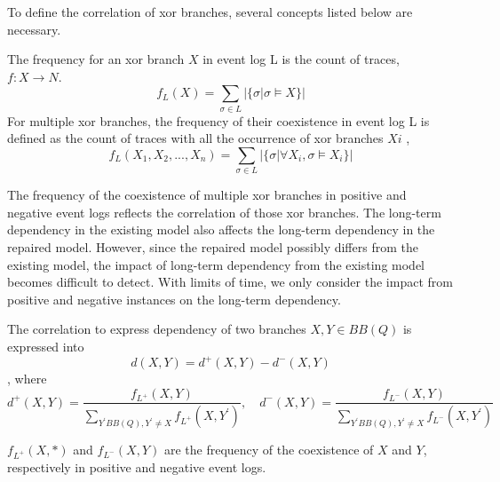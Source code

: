 To define the correlation of xor branches, several concepts listed below are necessary. 
\begin{definition}
	The frequency for an xor branch $X$ in event log L is the count of traces, $f: X \rightarrow N$.   
	\[f_{L}(X) = \sum_{\sigma \in L} |\{\sigma \vert \sigma \models X\} |\]
	For multiple xor branches, the frequency of their coexistence in event log L is defined as the count of traces with all the occurrence of xor branches ${Xi}$ , \[f_{L}(X_1, X_2,...,X_n)= \sum_{\sigma \in L} |\{\sigma \vert \forall X_i, \sigma \models X_i\} | \]
\end{definition}
The frequency of the coexistence of multiple xor branches in positive and negative event logs reflects the correlation of those xor branches. The long-term dependency in the existing model also affects the long-term dependency in the repaired model. However, since the repaired model possibly differs from the existing model, the impact of long-term dependency from the existing model becomes difficult to detect. With limits of time, we only consider the impact from positive and negative instances on the long-term dependency.
\begin{definition} The correlation to express dependency of two branches $X,Y \in BB(Q)$ is expressed into
	\[d(X,Y)=  d^{+}(X, Y) -d^{-}(X, Y)\], where 
	\[d^{+}(X, Y)= \frac{f_{L^+}(X, Y)}{\sum_{Y^\prime BB(Q), Y^\prime \neq X} f_{L^+}(X, Y^\prime)}, \quad d^{-}(X, Y)= \frac{f_{L^-}(X, Y)}{\sum_{Y^\prime BB(Q), Y^\prime \neq X} f_{L^-}(X, Y^\prime)}\]	
\end{definition}
$f_{L^+}(X, *) $ and $f_{L^-}(X, Y)$ are the frequency of the coexistence of $X$ and $Y$, respectively in positive and negative event logs.
